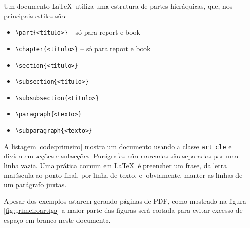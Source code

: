 Um documento \LaTeX\ utiliza uma estrutura de partes hieráquicas, que, nos principais estilos são:
    \begin{itemize}
    \item \lstinline|\part{<título>}| -- só para report e book
    \item \lstinline|\chapter{<título>}| -- só para report e book
    \item \lstinline|\section{<título>}|
    \item \lstinline|\subsection{<título>}|
    \item \lstinline|\subsubsection{<título>}|
    \item \lstinline|\paragraph{<texto>}|
    \item \lstinline|\subparagraph{<texto>}|
\end{itemize}

A listagem \ref{code:primeiro} mostra um documento usando a classe \lstinline|article| e divido em seções e subseções.
Parágrafos não marcados são separados por uma linha vazia.
Uma prática comum em \LaTeX\ é preencher um frase, da letra maiúscula ao ponto final, por linha de texto, e, obviamente, manter as linhas de um parágrafo juntas.

Apesar dos exemplos estarem gerando páginas de PDF,  como mostrado na figura \ref{fig:primeiroartigo} a maior parte
das figuras será cortada para evitar excesso de espaço em branco
neste documento.



